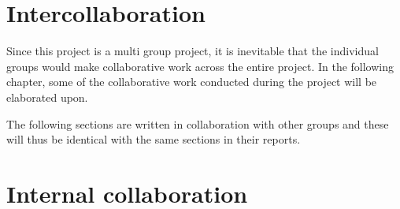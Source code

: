 \chapter{Intercollaboration}\label{CAP:Intercollaboration}
Since this project is a multi group project, it is inevitable that the individual groups would make collaborative work across the entire project. 
In the following chapter, some of the collaborative work conducted during the project will be elaborated upon. 

The following sections are written in collaboration with other groups and these will thus be identical with the same sections in their reports. 



\chapter{Internal collaboration}\label{CAP:InternalCollaboration}

